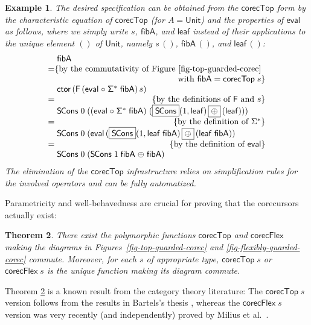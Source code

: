 \documentclass[preprint,draft]
{sigplanconf}
\newcommand\vvthinspace{\kern.041667ex}
\newcommand\TC{\mathsf}
\newtheorem{theorem}{Theorem}
\newtheorem{eexample}[theorem]{Example}
\newcommand{\<}{\langle}
\renewcommand{\>}{\rangle}
\renewcommand{\eta}{{{\mathsf{leaf}}}}
\newcommand{\ctor}{{{\mathsf{ctor}}}}
\newcommand{\Call}{{{\eta}}}
\newcommand{\eval}{{{\mathsf{eval}}}}
\newcommand\corecU{\mathsf{corecTop}}
\newcommand\corecUU{\mathsf{corecFlex}}
\newcommand{\SCons}{{{\mathsf{S\hspace*{-0.2ex}Cons}}}}
\newcommand{\opls}{\mathrel\oplus}
\newcommand{\fibA}{{{\mathsf{fibA}}}}
\newcommand{\F}{{\TC{F}}}
\renewcommand{\SS}{{\TC{\Sigma}}}
\newcommand{\Unit}{{\TC{Unit}}}
\newcommand\bb[1]{\fbox{$#1$}}
\begin{document}
\begin{eexample}
The desired specification can be obtained from the $\corecU$ form by the characteristic equation
of $\corecU$ (for $A = \Unit$) and the properties of $\eval$ as follows, where we simply write $s$, $\fibA$, and $\Call$ instead of their applications
to the unique element $()$ of $\Unit$,
namely $s\,()$, $\fibA\,()$, and $\Call\,()$:
$$
  \begin{array}{@{}l@{}}
    \phantom{{=}\;}\fibA \\{=}\hfill\mbox{\{by the commutativity of Figure~\ref{fig-top-guarded-corec}\phantom{\}}}\\
	\phantom{=}\hfill\mbox{\phantom{\{}with \ensuremath{\fibA = \corecU\;s}\}} \\\phantom{{=}\;}\ctor\,(\F\,(\eval \mathrel\circ \SS^*\;\fibA)\,s) \\{=}\hfill\mbox{\{by the definitions of $\F$ and $s$\}}\\\phantom{{=}\;}\SCons\;0\;((\eval \mathrel\circ \SS^*\;\fibA)\;
      (\bb{\SCons}(1,\Call) \,\bb{\opls}\, (\Call))) \\{=}\hfill\mbox{\{by the definition of $\Sigma^*$\}}\\\phantom{{=}\;}\SCons\;0\;(\eval \, (\bb{\SCons}(1,\Call\;\fibA) \,\bb{\opls}\, (\Call\;\fibA))  \\{=}\hfill\mbox{\{by the definition of $\eval$\}} \\\phantom{{=}\;}\SCons\;0\;(\SCons\;1\;\fibA \vvthinspace\opls\vvthinspace \fibA)
  \end{array}
  $$
The elimination of the $\corecU$ infrastructure relies on
simplification rules for the involved operators
and can be fully automatized. \end{eexample}


Parametricity and well-behavedness are crucial for proving that the corecursors
actually exist:


\begin{theorem}\label{corec-char}\rm
There exist the polymorphic functions $\corecU$ and $\corecUU$
making the diagrams in Figures~\ref{fig-top-guarded-corec} and \ref{fig-flexibly-guarded-corec} commute.
Moreover, for each $s$ of appropriate type, $\corecU\;s$
or $\corecUU\;s$ is the unique
function making its diagram commute.
\end{theorem}

Theorem \ref{corec-char} is a known result from the category theory literature:
The $\corecU\;s$ version follows from the results in Bartels's thesis \cite{bartels-thesis}, whereas the $\corecUU\;s$ version
was very recently (and independently) proved by Milius et al.\ \cite[Theorem~2.16]{milius-modular}.
\end{document}
